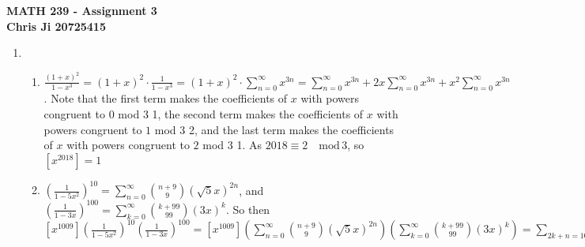 \documentclass[10pt,english]{article}
\begin{document}
\noindent \begin{center}
\textbf{\large{}MATH 239 - Assignment 3}\\
\textbf{\large{}Chris Ji 20725415}
\par\end{center}{\large \par}
\medskip{}

\begin{enumerate}
\item \begin{enumerate}
    \item $\frac{(1+x)^2}{1-x^3}=(1+x)^2\cdot\frac{1}{1-x^3}=(1+x)^2\cdot\sum_{n=0}^\infty x^{3n}=\sum_{n=0}^\infty x^{3n}+2x\sum_{n=0}^\infty x^{3n}+x^2\sum_{n=0}^\infty x^{3n}$. Note that the first term makes the coefficients of $x$ with powers congruent to $0$ mod $3$ 1, the second term makes the coefficients of $x$ with powers congruent to $1$ mod $3$ 2, and the last term makes the coefficients of $x$ with powers congruent to $2$ mod $3$ 1. As $2018\equiv2\quad\text{mod}\,3$, so $[x^{2018}]=1$ 
    
    \item $\left(\frac{1}{1-5x^2}\right)^{10}=\sum_{n=0}^\infty{n+9\choose9}(\sqrt{5}x)^{2n}$, and $\left(\frac{1}{1-3x}\right)^{100}=\sum_{k=0}^\infty{k+99\choose99}(3x)^k$. So then  $[x^{1009}]\left(\frac{1}{1-5x^2}\right)^{10}\left(\frac{1}{1-3x}\right)^{100}=[x^{1009}]\left(\sum_{n=0}^\infty{n+9\choose9}(\sqrt{5}x)^{2n}\right)\left(\sum_{k=0}^\infty{k+99\choose99}(3x)^k\right) = \sum_{2k+n=1009,k\geq0,n\geq0}{k+9\choose9}{n+99\choose99}5^k3^n$
    \end{enumerate}


\end{enumerate}
\end{document}
